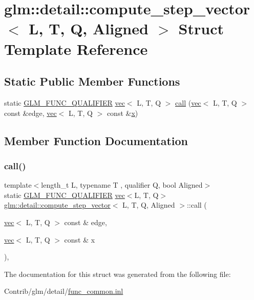\hypertarget{structglm_1_1detail_1_1compute__step__vector}{}\section{glm\+:\+:detail\+:\+:compute\+\_\+step\+\_\+vector$<$ L, T, Q, Aligned $>$ Struct Template Reference}
\label{structglm_1_1detail_1_1compute__step__vector}
\subsection*{Static Public Member Functions}
\begin{DoxyCompactItemize}
\item 
static \mbox{\hyperlink{setup_8hpp_a33fdea6f91c5f834105f7415e2a64407}{G\+L\+M\+\_\+\+F\+U\+N\+C\+\_\+\+Q\+U\+A\+L\+I\+F\+I\+ER}} \mbox{\hyperlink{structglm_1_1vec}{vec}}$<$ L, T, Q $>$ \mbox{\hyperlink{structglm_1_1detail_1_1compute__step__vector_a495017a548067602a85fc3b9eb8563be}{call}} (\mbox{\hyperlink{structglm_1_1vec}{vec}}$<$ L, T, Q $>$ const \&edge, \mbox{\hyperlink{structglm_1_1vec}{vec}}$<$ L, T, Q $>$ const \&\mbox{\hyperlink{_s_d_l__opengl_8h_ad0e63d0edcdbd3d79554076bf309fd47}{x}})
\end{DoxyCompactItemize}


\subsection{Member Function Documentation}
\mbox{\label{structglm_1_1detail_1_1compute__step__vector_a495017a548067602a85fc3b9eb8563be}} 
\subsubsection{\texorpdfstring{call()}{call()}}
{\footnotesize\ttfamily template$<$length\+\_\+t L, typename T , qualifier Q, bool Aligned$>$ \\
static \mbox{\hyperlink{setup_8hpp_a33fdea6f91c5f834105f7415e2a64407}{G\+L\+M\+\_\+\+F\+U\+N\+C\+\_\+\+Q\+U\+A\+L\+I\+F\+I\+ER}} \mbox{\hyperlink{structglm_1_1vec}{vec}}$<$L, T, Q$>$ \mbox{\hyperlink{structglm_1_1detail_1_1compute__step__vector}{glm\+::detail\+::compute\+\_\+step\+\_\+vector}}$<$ L, T, Q, Aligned $>$\+::call (\begin{DoxyParamCaption}\item[{\mbox{\hyperlink{structglm_1_1vec}{vec}}$<$ L, T, Q $>$ const \&}]{edge,  }\item[{\mbox{\hyperlink{structglm_1_1vec}{vec}}$<$ L, T, Q $>$ const \&}]{x }\end{DoxyParamCaption})\hspace{0.3cm}{\ttfamily [inline]}, {\ttfamily [static]}}



The documentation for this struct was generated from the following file\+:\begin{DoxyCompactItemize}
\item 
Contrib/glm/detail/\mbox{\hyperlink{func__common_8inl}{func\+\_\+common.\+inl}}\end{DoxyCompactItemize}

